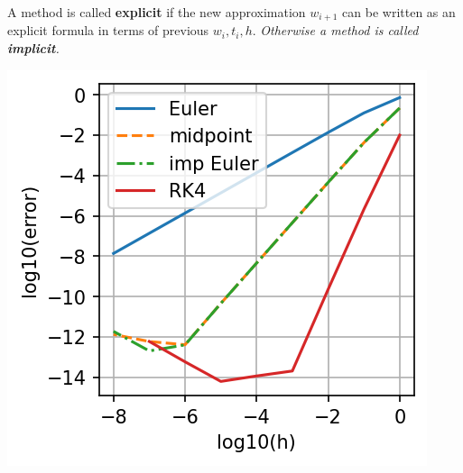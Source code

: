 \documentclass[12pt,letterpaper,noanswers]{exam}
\begin{document}
\begin{tcolorbox}
    A method is called \textbf{explicit} if the new approximation $w_{i+1}$ can be written as an explicit formula in terms of previous $w_i, t_i, h$.  \emph{Otherwise a method is called \textbf{implicit}.}
\end{tcolorbox}
\includegraphics[]{img/C18error.png}
\end{document}

